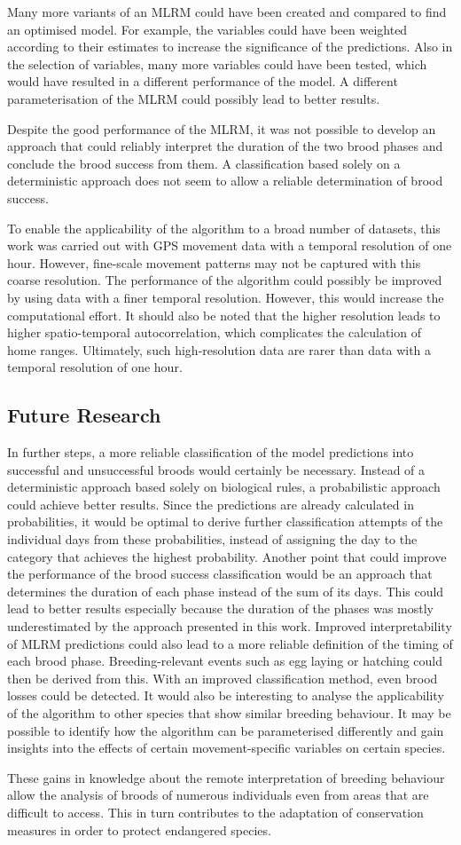 Many more variants of an MLRM could have been created and compared to find an optimised model. For example, the variables could have been weighted according to their estimates to increase the significance of the predictions. Also in the selection of variables, many more variables could have been tested, which would have resulted in a different performance of the model. A different parameterisation of the MLRM could possibly lead to better results.

Despite the good performance of the MLRM, it was not possible to develop an approach that could reliably interpret the duration of the two brood phases and conclude the brood success from them. A classification based solely on a deterministic approach does not seem to allow a reliable determination of brood success.

To enable the applicability of the algorithm to a broad number of datasets, this work was carried out with GPS movement data with a temporal resolution of one hour. However, fine-scale movement patterns may not be captured with this coarse resolution. The performance of the algorithm could possibly be improved by using data with a finer temporal resolution. However, this would increase the computational effort. It should also be noted that the higher resolution leads to higher spatio-temporal autocorrelation, which complicates the calculation of home ranges. Ultimately, such high-resolution data are rarer than data with a temporal resolution of one hour.

\subsection{Future Research}
In further steps, a more reliable classification of the model predictions into successful and unsuccessful broods would certainly be necessary. Instead of a deterministic approach based solely on biological rules, a probabilistic approach could achieve better results. Since the predictions are already calculated in probabilities, it would be optimal to derive further classification attempts of the individual days from these probabilities, instead of assigning the day to the category that achieves the highest probability. Another point that could improve the performance of the brood success classification would be an approach that determines the duration of each phase instead of the sum of its days. This could lead to better results especially because the duration of the phases was mostly underestimated by the approach presented in this work.
Improved interpretability of MLRM predictions could also lead to a more reliable definition of the timing of each brood phase. Breeding-relevant events such as egg laying or hatching could then be derived from this. With an improved classification method, even brood losses could be detected.
It would also be interesting to analyse the applicability of the algorithm to other species that show similar breeding behaviour. It may be possible to identify how the algorithm can be parameterised differently and gain insights into the effects of certain movement-specific variables on certain species.

These gains in knowledge about the remote interpretation of breeding behaviour allow the analysis of broods of numerous individuals even from areas that are difficult to access. This in turn contributes to the adaptation of conservation measures in order to protect endangered species.